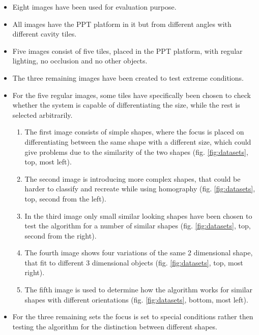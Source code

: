 \documentclass{article}
\begin{document}
\begin{itemize}
\item Eight images have been used for evaluation purpose.
\item All images have the PPT platform in it but from different angles with different cavity tiles.
\item Five images consist of five tiles, placed in the PPT platform, with regular lighting, no occlusion and no other objects.
 \item The three remaining images have been created to test extreme conditions.
\item For the five regular images, some tiles have specifically been chosen to check whether the system is capable of differentiating the size, while the rest is selected arbitrarily.
\begin{enumerate}
\item The first image consists of simple shapes, where the focus is placed on differentiating between the same shape with a different size, which could give problems due to the similarity of the two shapes (fig. \ref{fig:datasets}, top, most left).
\item The second image is introducing more complex shapes, that could be harder to classify and recreate while using homography (fig. \ref{fig:datasets}, top, second from the left).
\item In the third image only small similar looking shapes have been chosen to test the algorithm for a number of similar shapes (fig. \ref{fig:datasets}, top, second from the right).
\item The fourth image shows four variations of the same 2 dimensional shape, that fit to different 3 dimensional objects (fig. \ref{fig:datasets}, top, most right).
\item The fifth image is used to determine how the algorithm works for similar shapes with different orientations (fig. \ref{fig:datasets}, bottom, most left).
\end{enumerate}
\item For the three remaining sets the focus is set to special conditions rather then testing the algorithm for the distinction between different shapes.
\begin{enumerate}


\end{enumerate}
\end{itemize}
\end{document}
